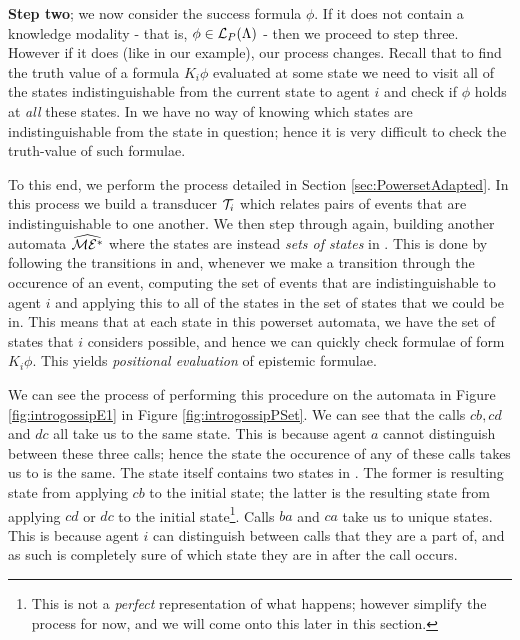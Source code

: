 \documentclass[10pt, a4paper]{report}
\begin{document}
\textbf{Step two}; we now consider the success formula $\phi$. If it does not
contain a knowledge modality - that is, $\phi \in \mathcal{L}_P(\Lambda)$ - then we
proceed to step three. However if it does (like in our example), our process
changes. Recall that to find the truth value of a formula $K_i \phi$ evaluated at
some state we need to visit all of the states indistinguishable from the current
state to agent $i$ and check if $\phi$ holds at \emph{all} these states. In
\mestar we have no way of knowing which states are indistinguishable from the
state in question; hence it is very difficult to check the truth-value of such
formulae.

To this end, we perform the process detailed in Section
\ref{sec:PowersetAdapted}. In this process we build a transducer $\mathcal{T}_i$
which relates pairs of events that are indistinguishable to one another. We then
step through \mestar again, building another automata $\widehat{\mathcal{ME^\ast}}$ where
the states are instead \emph{sets of states} in \mestar. This is done by
following the transitions in \mestar and, whenever we make a transition through
the occurence of an event, computing the set of events that are
indistinguishable to agent $i$ and applying this to all of the states in the set
of states that we could be in. This means that at each state in this powerset
automata, we have the set of states that $i$ considers possible, and hence we
can quickly check formulae of form $K_i \phi$. This yields \emph{positional
  evaluation} of epistemic formulae.

We can see the process of performing this procedure on the automata in Figure
\ref{fig:introgossipE1} in Figure \ref{fig:introgossipPSet}. We can see that the
calls $cb, cd$ and $dc$ all take us to the same state. This is because agent $a$
cannot distinguish between these three calls; hence the state the occurence of
any of these calls takes us to is the same. The state itself contains two states
in \mestar. The former is resulting state from applying $cb$ to the initial
state; the latter is the resulting state from applying $cd$ or $dc$ to the
initial state\footnote{This is not a \emph{perfect} representation of
  what happens; however simplify the process for now, and we will come onto this
  later in this section.}. Calls $ba$ and $ca$ take us to unique states. This is
because agent $i$ can distinguish between calls that they are a part of, and as
such is completely sure of which state they are in after the call occurs.
\end{document}
